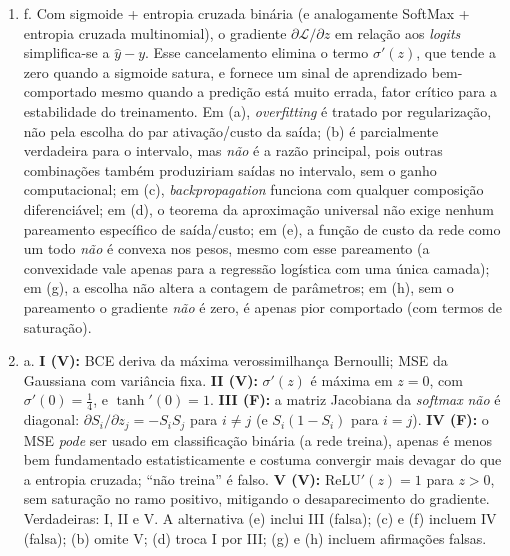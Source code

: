 \documentclass{dlproblemset}
\begin{document}
\begin{enumerate}[1)]
    \item f. Com sigmoide + entropia cruzada binária (e analogamente SoftMax + entropia cruzada multinomial), o gradiente $\partial \mathcal{L}/\partial z$ em relação aos \textit{logits} simplifica-se a $\hat{y} - y$. Esse cancelamento elimina o termo $\sigma'(z)$, que tende a zero quando a sigmoide satura, e fornece um sinal de aprendizado bem-comportado mesmo quando a predição está muito errada, fator crítico para a estabilidade do treinamento. Em (a), \textit{overfitting} é tratado por regularização, não pela escolha do par ativação/custo da saída; (b) é parcialmente verdadeira para o intervalo, mas \emph{não} é a razão principal, pois outras combinações também produziriam saídas no intervalo, sem o ganho computacional; em (c), \textit{backpropagation} funciona com qualquer composição diferenciável; em (d), o teorema da aproximação universal não exige nenhum pareamento específico de saída/custo; em (e), a função de custo da rede como um todo \emph{não} é convexa nos pesos, mesmo com esse pareamento (a convexidade vale apenas para a regressão logística com uma única camada); em (g), a escolha não altera a contagem de parâmetros; em (h), sem o pareamento o gradiente \emph{não} é zero, é apenas pior comportado (com termos de saturação).

    \item a. \textbf{I (V):} BCE deriva da máxima verossimilhança Bernoulli; MSE da Gaussiana com variância fixa. \textbf{II (V):} $\sigma'(z)$ é máxima em $z = 0$, com $\sigma'(0) = \tfrac{1}{4}$, e $\tanh'(0) = 1$. \textbf{III (F):} a matriz Jacobiana da \textit{softmax} \emph{não} é diagonal: $\partial S_i/\partial z_j = -S_i S_j$ para $i \neq j$ (e $S_i(1-S_i)$ para $i = j$). \textbf{IV (F):} o MSE \emph{pode} ser usado em classificação binária (a rede treina), apenas é menos bem fundamentado estatisticamente e costuma convergir mais devagar do que a entropia cruzada; ``não treina'' é falso. \textbf{V (V):} $\mathrm{ReLU}'(z) = 1$ para $z > 0$, sem saturação no ramo positivo, mitigando o desaparecimento do gradiente. Verdadeiras: I, II e V. A alternativa (e) inclui III (falsa); (c) e (f) incluem IV (falsa); (b) omite V; (d) troca I por III; (g) e (h) incluem afirmações falsas.


\end{enumerate}
\end{document}
